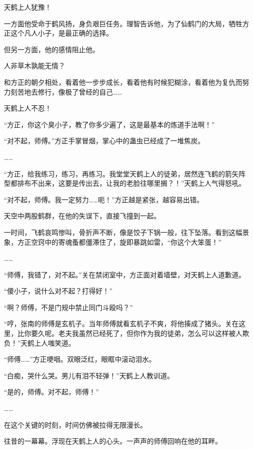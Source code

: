 
\begin{this_body}

天鹤上人犹豫！

一方面他受命于鹤风扬，身负艰巨任务。理智告诉他，为了仙鹤门的大局，牺牲方正这个凡人小子，是最正确的选择。

但另一方面，他的感情阻止他。

人非草木孰能无情？

和方正的朝夕相处，看着他一步步成长，看着他有时候犯糊涂，看着他为复仇而努力刻苦地去修行，像极了曾经的自己……

天鹤上人不忍！

“方正，你这个臭小子，教了你多少遍了，这是最基本的炼道手法啊！”

“对不起，师傅。”方正手掌冒烟，掌心中的蛊虫已经成了一堆焦炭。

……

“方正，给我练习，练习，再练习。我堂堂天鹤上人的徒弟，居然连飞鹤的箭矢阵型都排布不出来，这要是传出去，让我的老脸往哪里搁？！”天鹤上人气得怒吼。

“对不起，师傅。我一定努力……呃！”方正越是紧张，越容易出错。

天空中两股鹤群，在他的失误下，直接飞撞到一起。

一时间，飞鹤哀鸣惨叫，骨折声不断，像是饺子下锅一般，往下坠落。看到这幅景象，方正空窍中的寄魂蚤都僵滞住了，旋即暴跳如雷，“你这个大笨蛋！”

……

“师傅，我错了，对不起。”关在禁闭室中，方正面对着墙壁，对天鹤上人道歉道。

“傻小子，说什么对不起？打得好！”

“啊？师傅，不是门规中禁止同门斗殴吗？”

“哼，张南的师傅是玄机子。当年师傅就看玄机子不爽，将他揍成了猪头。关在这里，比你要久呢。老夫我虽然已经死了，但你作为我的徒弟，怎么可以这样被人欺负！”天鹤上人嗤笑道。

“师傅……”方正哽咽。双眼泛红，眼眶中滚动泪水。

“白痴，哭什么哭。男儿有泪不轻弹！”天鹤上人教训道。

“是的，师傅。对不起，师傅！”

……

在这个关键的时刻，时间仿佛被拉得无限漫长。

往昔的一幕幕。浮现在天鹤上人的心头。一声声的师傅回响在他的耳畔。


\end{this_body}
